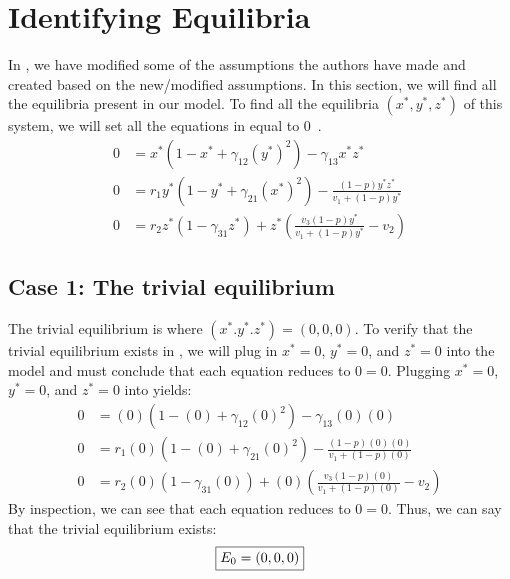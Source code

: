 \section{Identifying Equilibria}\label{sec:identify_equilibria}
In , we have modified some of the assumptions the authors have made and created  based on the new/modified assumptions. In this section, we will find all the equilibria present in our model. To find all the equilibria $\left(x^*,y^*,z^*\right)$ of this system, we will set all the equations in  equal to 0~\cite{book:2478639}.
\begin{subequations}
    \begin{align}
        0 &= x^*\left(1-x^*+\gamma_{12}\left(y^*\right)^2\right)-\gamma_{13}x^*z^*
        \label{eq:4.1a}\\
        0 &= r_1y^*\left(1-y^*+\gamma_{21}\left(x^*\right)^2\right)-\frac{\left(1-p\right)y^*z^*}{v_1+\left(1-p\right)y^*}
        \label{eq:4.1b}\\
        0 &= r_2z^*\left(1-\gamma_{31}z^*\right)+z^*\left(\frac{v_3\left(1-p\right)y^*}{v_1+\left(1-p\right)y^*}-v_2\right)
        \label{eq:4.1c}
    \end{align}
    \label{eq:4.1}
\end{subequations}

\subsection{Case 1: The trivial equilibrium}\label{subsec:trivial_equilibrium}
The trivial equilibrium is where $\left(x^*.y^*.z^*\right)=(0,0,0)$. To verify that the trivial equilibrium exists in , we will plug in $x^*=0$, $y^*=0$, and $z^*=0$ into the model and must conclude that each equation reduces to $0=0$. Plugging $x^*=0$, $y^*=0$, and $z^*=0$ into  yields:
\begin{align*}
    0 &= (0)\left(1-(0)+\gamma_{12}(0)^2\right)-\gamma_{13}(0)(0)\\
    0 &= r_1(0)\left(1-(0)+\gamma_{21}(0)^2\right)-\frac{\left(1-p\right)(0)(0)}{v_1+\left(1-p\right)(0)}\\
    0 &= r_2(0)\left(1-\gamma_{31}(0)\right)+(0)\left(\frac{v_3\left(1-p\right)(0)}{v_1+\left(1-p\right)(0)}-v_2\right)
\end{align*}
By inspection, we can see that each equation reduces to $0=0$. Thus, we can say that the trivial equilibrium exists:
\[
\fbox{$\displaystyle E_0=\left(0,0,0\right)$}
\]

